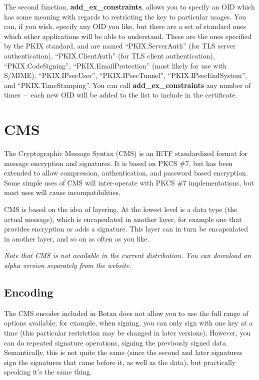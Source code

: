 \documentclass{article}
\newcommand{\function}[1]{\textbf{#1}}
\begin{document}
The second function, \function{add\_ex\_constraints}, allows you to specify an
OID which has some meaning with regards to restricting the key to particular
usages. You can, if you wish, specify any OID you like, but there are a set of
standard ones which other applications will be able to understand. These are
the ones specified by the PKIX standard, and are named ``PKIX.ServerAuth'' (for
TLS server authentication), ``PKIX.ClientAuth'' (for TLS client
authentication), ``PKIX.CodeSigning'', ``PKIX.EmailProtection'' (most likely
for use with S/MIME), ``PKIX.IPsecUser'', ``PKIX.IPsecTunnel'',
``PKIX.IPsecEndSystem'', and ``PKIX.TimeStamping''. You can call
\function{add\_ex\_constraints} any number of times~--~each new OID will be
added to the list to include in the certificate.

\pagebreak

\section{CMS}

The Cryptographic Message Syntax (CMS) is an IETF standardized format for
message encryption and signatures. It is based on PKCS \#7, but has been
extended to allow compression, authentication, and password based encryption.
Some simple uses of CMS will inter-operate with PKCS \#7 implementations, but
most uses will cause incompatibilities.

CMS is based on the idea of layering. At the lowest level is a data type (the
actual message), which is encapsulated in another layer, for example one that
provides encryption or adds a signature. This layer can in turn be encapsulated
in another layer, and so on as often as you like.

\emph{Note that CMS is not available in the current distribution. You can
download an alpha version separately from the website.}

\subsection{Encoding}

The CMS encoder included in Botan does not allow you to use the full range of
options available; for example, when signing, you can only sign with one key at
a time (this particular restriction may be changed in later versions). However,
you can do repeated signature operations, signing the previously signed
data. Semantically, this is not quite the same (since the second and later
signatures sign the signatures that came before it, as well as the data), but
practically speaking it's the same thing.
\end{document}

